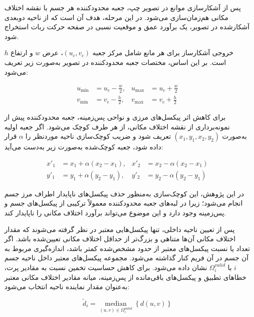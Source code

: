 پس از آشکارسازی موانع در تصویر چپ، جعبه محدودکننده هر جسم با نقشه اختلاف مکانی هم‌زمان‌سازی می‌شود. در این مرحله، هدف آن است که از ناحیه دوبعدی آشکارشده در تصویر، یک برآورد عمق و موقعیت نسبی در صفحه حرکت ربات استخراج شود.

خروجی آشکارساز برای هر مانع شامل مرکز جعبه \((u_c,v_c)\)، عرض \(w\) و ارتفاع \(h\) است. بر این اساس، مختصات جعبه محدودکننده در تصویر به‌صورت زیر تعریف می‌شود:

\begin{equation}
	\begin{aligned}
		u_{\min} &= u_c - \frac{w}{2}, &
		u_{\max} &= u_c + \frac{w}{2} \\
		v_{\min} &= v_c - \frac{h}{2}, &
		v_{\max} &= v_c + \frac{h}{2}
	\end{aligned}
	\label{eq:bbox_limits}
\end{equation}

برای کاهش اثر پیکسل‌های مرزی و نواحی پس‌زمینه، جعبه محدودکننده پیش از نمونه‌برداری از نقشه اختلاف مکانی، از هر طرف کوچک می‌شود. اگر جعبه اولیه به‌صورت \((x_1,y_1,x_2,y_2)\) تعریف شود و ضریب کوچک‌سازی ناحیه موردنظر را \(\alpha\) قرار داده شود، جعبه کوچک‌شده به‌صورت زیر به‌دست می‌آید:

\begin{equation}
	\begin{aligned}
		x'_1 &= x_1 + \alpha(x_2-x_1), &
		x'_2 &= x_2 - \alpha(x_2-x_1) \\
		y'_1 &= y_1 + \alpha(y_2-y_1), &
		y'_2 &= y_2 - \alpha(y_2-y_1)
	\end{aligned}
	\label{eq:roi_shrink}
\end{equation}

در این پژوهش، این کوچک‌سازی به‌منظور حذف پیکسل‌های ناپایدار اطراف مرز جسم انجام می‌شود؛ زیرا در لبه‌های جعبه محدودکننده معمولاً ترکیبی از پیکسل‌های جسم و پس‌زمینه وجود دارد و این موضوع می‌تواند برآورد اختلاف مکانی را ناپایدار کند.

پس از تعیین ناحیه داخلی، تنها پیکسل‌هایی معتبر در نظر گرفته می‌شوند
که مقدار اختلاف مکانی آن‌ها متناهی و بزرگ‌تر از حداقل اختلاف مکانی
تعیین‌شده باشد. اگر تعداد یا نسبت پیکسل‌های معتبر از حدود مشخص‌شده
کمتر باشد، اندازه‌گیری مربوط به آن جسم در آن فریم کنار گذاشته می‌شود.
مجموعه پیکسل‌های معتبر داخل ناحیه جسم \(i\) با
\(\Omega_i^{valid}\) نشان داده می‌شود. برای کاهش حساسیت تخمین نسبت
به مقادیر پرت، خطاهای تطبیق و پیکسل‌های باقی‌مانده از پس‌زمینه،
میانه مقادیر اختلاف مکانی معتبر به‌عنوان مقدار نماینده ناحیه انتخاب
می‌شود:

\begin{equation}
	\tilde{d}_i =
	\underset{(u,v)\in\Omega_i^{valid}}{\operatorname{median}}
	\left\{d(u,v)\right\}
	\label{eq:median_valid_disparity}
\end{equation}

